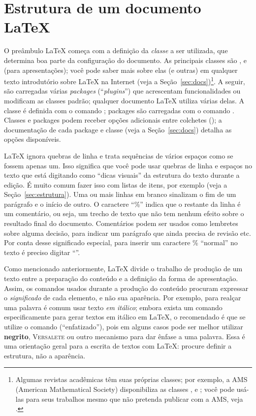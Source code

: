\section{Estrutura de um documento \LaTeX{}}
\label{sec:basico}

\enlargethispage{.5\baselineskip}

O preâmbulo \LaTeX{} começa com a definição da \emph{classe} a ser utilizada,
que determina boa parte da configuração do documento. As principais classes
são ,  e  (para apresentações); você pode
saber mais sobre elas (e outras) em qualquer texto introdutório sobre \LaTeX{}
na Internet (veja a Seção~\ref{sec:docs})\footnote{Algumas revistas acadêmicas
têm suas próprias classes; por exemplo, a AMS (American Mathematical Society)
disponibiliza as classes ,  e ; você
pode usá-las para seus trabalhos mesmo que não pretenda publicar com a AMS,
veja .}. A seguir, são carregadas
várias \emph{packages} (``\emph{plugins}'') que acrescentam funcionalidades ou
modificam as classes padrão; qualquer documento \LaTeX{} utiliza várias delas.
A classe é definida com o comando ;
packages são carregadas com o comando .
Classes e packages podem receber opções adicionais entre colchetes
(); a documentação
de cada package e classe (veja a Seção~\ref{sec:docs}) detalha as opções
disponíveis.

\LaTeX{} ignora quebras de linha e trata sequências de vários espaços como
se fossem apenas um. Isso significa que você pode usar quebras de linha e
espaços no texto que está digitando como ``dicas visuais'' da estrutura do
texto durante a edição. É muito comum fazer isso com listas de itens, por
exemplo (veja a Seção~\ref{sec:estrutura}). Uma ou mais linhas em branco
sinalizam o fim de um parágrafo e o início de outro. O caractere ``\%''
indica que o restante da linha é um comentário, ou seja, um trecho de texto
que não tem nenhum efeito sobre o resultado final do documento. Comentários
podem ser usados como lembretes sobre alguma decisão, para indicar um
parágrafo que ainda precisa de revisão etc. Por conta desse significado
especial, para inserir um caractere \% ``normal'' no texto é preciso digitar
``\ltxcmd{\%}''.

Como mencionado anteriormente, \LaTeX{} divide o trabalho de produção
de um texto entre a preparação do conteúdo e a definição da forma de
apresentação. Assim, os comandos usados durante a produção do conteúdo
procuram expressar o \emph{significado} de cada elemento, e não sua
aparência. Por exemplo, para realçar uma palavra é comum usar texto
\textit{em itálico}; embora exista um comando especificamente para gerar
textos em itálico em \LaTeX{}, o recomendado é que se utilize o comando
 (``enfatizado''), pois em alguns casos pode ser melhor
utilizar \textbf{negrito}, \textsc{Versalete} ou outro mecanismo para
dar ênfase a uma palavra. Essa é uma orientação geral para a escrita de
textos com \LaTeX{}: procure definir a estrutura, não a aparência.

